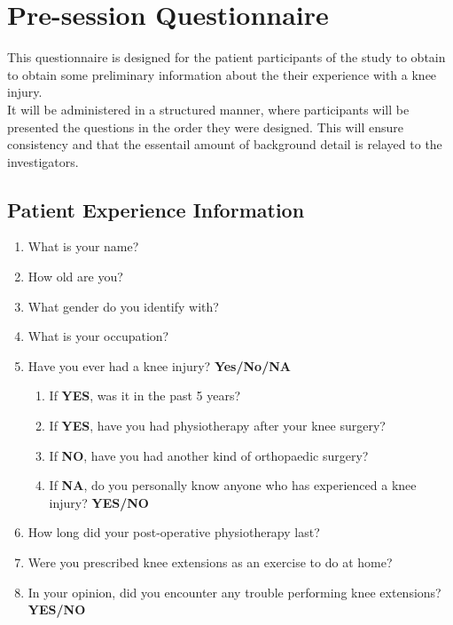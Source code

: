 \documentclass[12pt, titlepage]{article}
\begin{document}
\section{Pre-session Questionnaire} \label{appendix:preq}
This questionnaire is designed for the patient participants of the study to obtain to obtain 
some preliminary information about the their experience with a knee injury. \\
It will be administered in a structured manner, where participants will be presented the questions 
in the order they were designed. This will ensure consistency and that the essentail amount of
background detail is relayed to the investigators.

\subsection{\textbf{Patient Experience Information}}
\begin{enumerate}
    \item What is your name?
    \item How old are you?
    \item What gender do you identify with? 
    \item What is your occupation?
    \item Have you ever had a knee injury? \textbf{Yes/No/NA}
    \begin{enumerate}
        \item If \textbf{YES}, was it in the past 5 years?
        \item If \textbf{YES}, have you had physiotherapy after your knee surgery?
        \item If \textbf{NO}, have you had another kind of orthopaedic surgery?
        \item If \textbf{NA}, do you personally know anyone who has experienced a knee injury? \textbf{YES/NO}
    \end{enumerate}
    \item How long did your post-operative physiotherapy last?
    \item Were you prescribed knee extensions as an exercise to do at home?
    \item In your opinion, did you encounter any trouble performing knee extensions? \textbf{YES/NO}
\end{enumerate}
\end{document}
